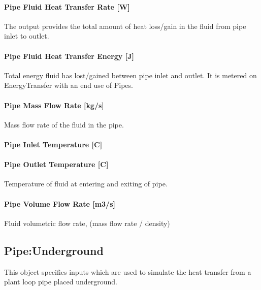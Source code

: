 \paragraph{Pipe Fluid Heat Transfer Rate {[}W{]}}\label{pipe-fluid-heat-transfer-rate-w-1}

The output provides the total amount of heat loss/gain in the fluid from pipe inlet to outlet.

\paragraph{Pipe Fluid Heat Transfer Energy {[}J{]}}\label{pipe-fluid-heat-transfer-energy-j-1}

Total energy fluid has lost/gained between pipe inlet and outlet. It is metered on EnergyTransfer with an end use of Pipes.

\paragraph{Pipe Mass Flow Rate {[}kg/s{]}}\label{pipe-mass-flow-rate-kgs-1}

Mass flow rate of the fluid in the pipe.

\paragraph{Pipe Inlet Temperature {[}C{]}}\label{pipe-inlet-temperature-c-1}

\paragraph{Pipe Outlet Temperature {[}C{]}}\label{pipe-outlet-temperature-c-1}

Temperature of fluid at entering and exiting of pipe.

\paragraph{Pipe Volume Flow Rate {[}m3/s{]}}\label{pipe-volume-flow-rate-m3s-1}

Fluid volumetric flow rate, (mass flow rate / density)

\subsection{Pipe:Underground}\label{pipeunderground}

This object specifies inputs which are used to simulate the heat transfer from a plant loop pipe placed underground.


